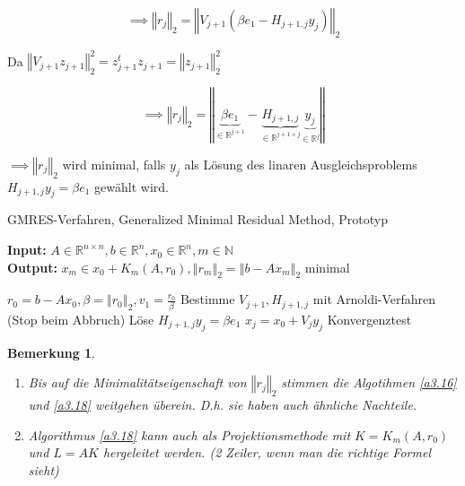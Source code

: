 \documentclass{book}
\newtheorem{remark}[algorithm]{Bemerkung}
\def\R{\mathbb{R}}
\def\N{\mathbb{N}}
\begin{document}
            \[\implies \left\Vert r_j \right\Vert_2=\left\Vert V_{j+1}(\beta e_1-H_{j+1,j}y_j) \right\Vert_2\]
            
            Da $ \left\Vert V_{j+1}z_{j+1} \right\Vert_2^2=z_{j+1}^tz_{j+1}=\left\Vert z_{j+1} \right\Vert_2^2$


            \begin{equation}\label{g3.7}
                \implies \left\Vert r_j \right\Vert_2=\left\Vert \underbrace{\beta e_1}_{\in\R^{j+1}} - \underbrace{H_{j+1,j}}_{\in\R^{j+1\times j}}\underbrace{y_j}_{\in\R^{j}} \right\Vert  
            \end{equation}
            
            $\implies \left\Vert r_j \right\Vert_2$ wird minimal, falls $y_j$ als Lösung des linaren Ausgleichsproblems 
            $H_{j+1,j}y_j=\beta e_1$ gewählt wird.

            \begin{algorithm}[H]\label{a3.18} %
                \caption{GMRES-Verfahren, Generalized Minimal Residual Method, Prototyp}
                \textbf{Input:} $A\in\R^{n\times n},b\in\R^n,x_0\in\R^n,m\in\N$\\
                \textbf{Output:} $x_m\in x_0+K_m(A,r_0),\left\Vert r_m \right\Vert_2=\left\Vert b-Ax_m \right\Vert_2$ minimal
                \begin{algorithmic}
                \State $r_0=b-Ax_0,\beta=\left\Vert r_0 \right\Vert_2,v_1=\frac{r_0}{\beta}$
                    \State Bestimme $V_{j+1}, H_{j+1,j}$ mit Arnoldi-Verfahren (Stop beim Abbruch)
                    \State Löse $H_{j+1,j}y_j=\beta e_1$
                    \State $x_j=x_0+V_jy_j$
                    \State Konvergenztest
                \EndFor
                \end{algorithmic}
            \end{algorithm}

            \begin{remark}\label{b3.19} %
                \begin{enumerate}
                    \item Bis auf die Minimalitätseigenschaft von $\left\Vert r_j \right\Vert_2$ stimmen die Algotihmen \ref{a3.16} und \ref{a3.18} weitgehen überein.
                    D.h. sie haben auch ähnliche Nachteile.
                \item Algorithmus \ref{a3.18} kann auch als Projektionsmethode mit $K=K_m(A,r_0)$ und 
                      $L=AK$ hergeleitet werden. (2 Zeiler, wenn man die richtige Formel sieht)
                \end{enumerate}
            \end{remark}
\end{document}
